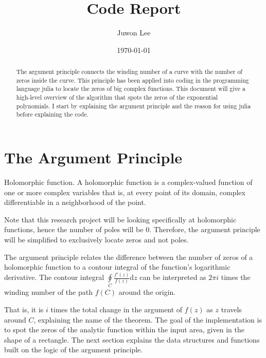 \documentclass[11pt,reqno,oneside,a4paper]{article}
\author{Juwon Lee}
\title{Code Report}
\date{\today}
\begin{document}
\maketitle
\thispagestyle{fancy}

\begin{abstract}
	The argument principle connects the winding number of a curve with the number of zeros inside the curve. 
	This principle has been applied into coding in the programming language julia to locate the zeros of big complex functions.
	This document will give a high-level overview of the algorithm that spots the zeros of the exponential polynomials.
	I start by explaining the argument principle and the reason for using julia before explaining the code.
\end{abstract}

\section{The Argument Principle}
	
\begin{defn}{Holomorphic function.}
A holomorphic function is a complex-valued function of one or more complex variables that is, at every point of its domain, complex differentiable in a neighborhood of the point. 
\end{defn}

Note that this research project will be looking specifically at holomorphic functions, hence the number of poles will be $0.$ 
Therefore, the argument principle will be simplified to exclusively locate zeros and not poles.

\begin{thm}
The argument principle relates the difference between the number of zeros of a holomorphic function to a contour integral of the function's logarithmic derivative. 
The contour integral $\oint\limits_{C} \frac{f'(z)}{f(z)}\mathrm{d}z $ can be interpreted as $2\pi i$ times the winding number of the path $f(C)$ around the origin. 
\end{thm}

That is, it is $i$ times the total change in the argument of $f(z)$ as $z$ travels around $C$, explaining the name of the theorem. 
The goal of the implementation is to spot the zeros of the analytic function within the input area, given in the shape of a rectangle.
The next section explains the data structures and functions built on the logic of the argument principle.
\end{document}
